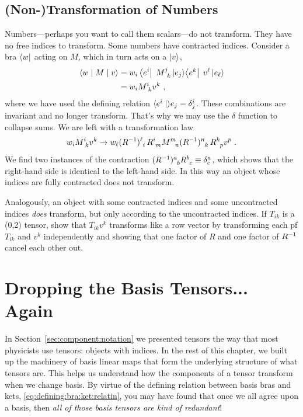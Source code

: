 \subsection{(Non-)Transformation of Numbers}

Numbers---perhaps you want to call them scalars---do not transform. They have no free indices to transform. Some numbers have contracted indices. Consider a bra $\left\langle w\right|$ acting on $M$, which in turn acts on a $\left|v\right\rangle$,
\begin{align}
    \la w \mid M \mid v \ra 
    &= 
    w_i \bra{e^i} \; M\aij{j}{k}\ket{e_j}\!\bra{e^k}
    \; v^\ell \ket{e_\ell} 
    \\&=
    w_i M\aij{i}{k}v^k 
    \ ,
\end{align}
where we have used the defining relation $\langle e^i\mid \rangle e_j = \delta^i_j$. These combinations are invariant and no longer transform. That's why we may use the $\delta$ function to collapse sums. We are left with a transformation law
\begin{align}
    w_i M\aij{i}{k}v^k 
    \to 
    w_\ell(R\inv)\aij{\ell}{i} \, R\aij{i}{m}
    M\aij{m}{n} (R\inv)\aij{n}{k} \, R\aij{k}{p} v^p \ .
\end{align}
We find two instances of the contraction $(R\inv)\aij{a}{b}R\aij{b}{c} \equiv \delta^a_c$, which shows that the right-hand side is identical to the left-hand side. In this way an object whose indices are fully contracted does not transform. 

\begin{exercise}
Analogously, an object with some contracted indices and some uncontracted indices \emph{does} transform, but only according to the uncontracted indices. If $T_{ik}$ is a (0,2) tensor, show that $T_{ik}v^k$ transforms like a row vector by transforming each pf $T_{ik}$ and $v^k$ independently and showing that one factor of $R$ and one factor of $R^{-1}$ cancel each other out.
\end{exercise}




\section{Dropping the Basis Tensors... Again}

In Section~\ref{sec:component:notation} we presented tensors the way that most physicists use tensors: objects with indices. In the rest of this chapter, we built up the machinery of basis linear maps that form the underlying structure of what tensors are. This helps us understand how the components of a tensor transform when we change basis. By virtue of the defining relation between basis bras and kets, \eqref{eq:defining:bra:ket:relatin}, you may have found that once we all agree upon a basis, then \emph{all of those basis tensors are kind of redundant}!

